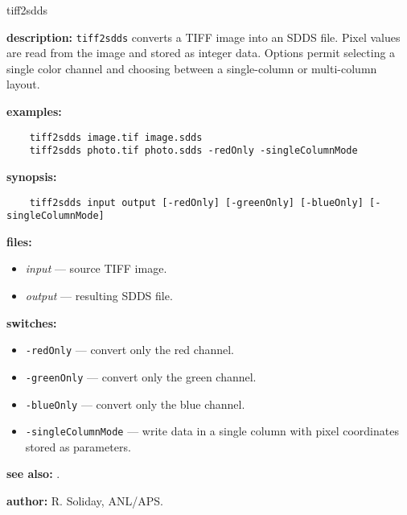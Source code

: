 \begin{sddsprog}{tiff2sdds}
  \item \textbf{description:} \verb|tiff2sdds| converts a TIFF image into an SDDS file. Pixel values are read from the image and stored as integer data. Options permit selecting a single color channel and choosing between a single-column or multi-column layout.
  \item \textbf{examples:}
    \begin{verbatim}
    tiff2sdds image.tif image.sdds
    tiff2sdds photo.tif photo.sdds -redOnly -singleColumnMode
    \end{verbatim}
  \item \textbf{synopsis:}
    \begin{verbatim}
    tiff2sdds input output [-redOnly] [-greenOnly] [-blueOnly] [-singleColumnMode]
    \end{verbatim}
  \item \textbf{files:}
    \begin{itemize}
      \item \emph{input} --- source TIFF image.
      \item \emph{output} --- resulting SDDS file.
    \end{itemize}
  \item \textbf{switches:}
    \begin{itemize}
      \item \verb|-redOnly| --- convert only the red channel.
      \item \verb|-greenOnly| --- convert only the green channel.
      \item \verb|-blueOnly| --- convert only the blue channel.
      \item \verb|-singleColumnMode| --- write data in a single column with pixel coordinates stored as parameters.
    \end{itemize}
  \item \textbf{see also:} .
  \item \textbf{author:} R. Soliday, ANL/APS.
\end{sddsprog}
